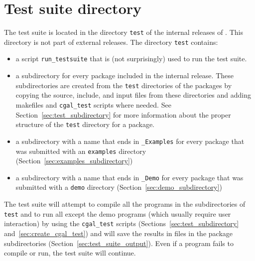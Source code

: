 \section{Test suite directory\label{sec:test_suite_directory}}

The test suite is located in the directory {\tt test} of the internal 
releases of \cgal. This directory is not part of external releases. The 
directory {\tt test} 
contains:
\begin{itemize}
   \item a script {\tt run\_testsuite}
         that is (not surprisingly) used to run the test suite.
   \item a subdirectory for every package included in the internal release.
         These subdirectories are created from the {\tt test} directories
         of the packages by copying the source, include, and input files from 
         these directories and adding makefiles and {\tt cgal\_test} scripts 
         where needed.  See Section~\ref{sec:test_subdirectory} for more
         information about the proper structure of the {\tt test} directory
         for a package.
   \item a subdirectory with a name that ends in {\tt \_Examples} for every 
         package that was submitted with an {\tt examples} directory 
         (Section~\ref{sec:examples_subdirectory})
   \item a subdirectory with a name that ends in {\tt \_Demo} for every
         package that was submitted with a {\tt demo} directory
         (Section~\ref{sec:demo_subdirectory})
\end{itemize}

The test suite will attempt to compile all the programs in the
subdirectories of {\tt test} and to run all except
the demo programs (which usually require user interaction) by using the 
{\tt cgal\_test} scripts 
(Sections~\ref{sec:test_subdirectory} and~\ref{sec:create_cgal_test})
and will save the results in files in the package subdirectories
(Section~\ref{sec:test_suite_output}). 
Even if a program fails to compile or run, the test suite will continue.



